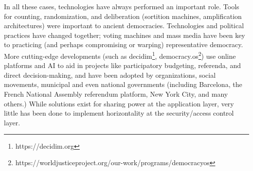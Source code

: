 In all these cases, technologies have always performed an important role. Tools
for counting, randomization, and deliberation (sortition machines, amplification
architectures) were important to ancient democracies. Technologies and political
practices have changed together; voting machines and mass media have been key to
practicing (and perhaps compromising or warping) representative democracy. More
cutting-edge developments (such as decidim\footnote{https://decidim.org}, democracy.os\footnote{https://worldjusticeproject.org/our-work/programs/democracyos}) use online platforms and
AI to aid in projects like participatory budgeting, referenda, and direct
decision-making, and have been adopted by organizations, social movements,
municipal and even national governments (including Barcelona, the French
National Assembly referendum platform, New York City, and many others.) While
solutions exist for sharing power at the application layer, very little has been
done to implement horizontality at the security/access control layer.  

%
